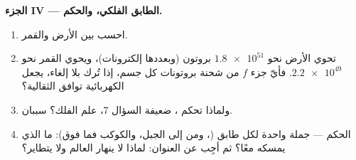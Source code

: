 \begin{problem}
\medskip
\noindent\textbf{الجزء IV --- الطابق الفلكي، والحكم.}
\begin{enumerate}[resume]
  \item احسب  بين الأرض والقمر.
  \item تحوي الأرض نحو $\num{1.8e51}$ بروتون (وبعددها
        إلكترونات)، ويحوي القمر نحو $\num{2.2e49}$. فأيّ جزء $f$ من
        شحنة بروتونات كل جسم، إذا تُرك بلا إلغاء، يجعل
         الكهربائية توافق  الثقالية؟
  \item ولماذا تحكم ، ضعيفة السؤال 7،
        علم الفلك؟ سببان.
  \item الحكم --- جملة واحدة لكل طابق (، ومن  إلى الجبل،
        والكوكب فما فوق): ما الذي يمسكه معًا؟ ثم أجِب عن العنوان:
        لماذا لا ينهار العالم ولا يتطاير؟
\end{enumerate}
\end{problem}
